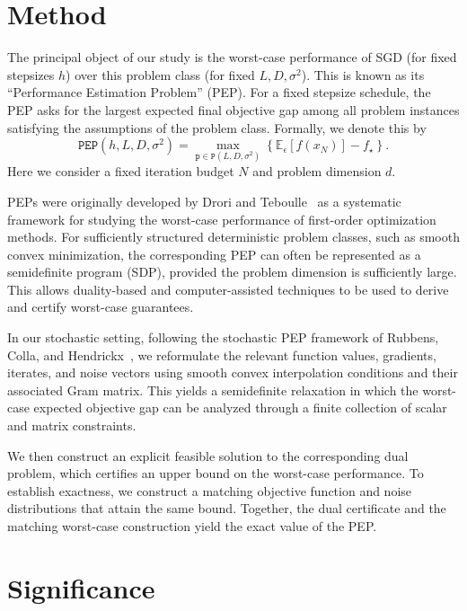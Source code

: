 \documentclass[11pt]{article}
\begin{document}
\section{Method}

The principal object of our study is the worst-case performance of SGD
(for fixed stepsizes $h$) over this problem class
(for fixed $L,D,\sigma^2$). This is known as its
``Performance Estimation Problem'' (PEP).
For a fixed stepsize schedule, the PEP asks for the largest
expected final objective gap among all problem instances satisfying the
assumptions of the problem class. Formally, we denote this by
\begin{equation*}\label{eq:PEP}
    \mathtt{PEP}(h,L,D,\sigma^2)
    =
    \max_{\mathtt{p}\in\mathtt{P}(L,D,\sigma^2)}
    \left\{
        \mathbb{E}_{\epsilon}\left[f(x_N)\right]-f_\star
    \right\}.
\end{equation*}
Here we consider a fixed iteration budget $N$ and problem dimension $d$.

PEPs were originally developed by Drori and Teboulle~\cite{drori2014performance} as a systematic framework for studying the
worst-case performance of first-order optimization methods. For sufficiently
structured deterministic problem classes, such as smooth convex minimization,
the corresponding PEP can often be represented as a semidefinite program
(SDP), provided the problem dimension is sufficiently large. This allows
duality-based and computer-assisted techniques to be used to derive and
certify worst-case guarantees.

In our stochastic setting, following the stochastic PEP framework of Rubbens, Colla, and Hendrickx~\cite{rubbens2025computer}, we reformulate the relevant function values,
gradients, iterates, and noise vectors using smooth convex interpolation
conditions and their associated Gram matrix. This yields a semidefinite relaxation in which the worst-case expected objective gap can be analyzed through a finite collection of scalar and matrix constraints.

We then construct an explicit feasible solution to the corresponding dual
problem, which certifies an upper bound on the worst-case performance.
To establish exactness, we construct a matching objective function and noise
distributions that attain the same bound. Together, the dual certificate and
the matching worst-case construction yield the exact value of the PEP.
\section{Significance}
\end{document}
